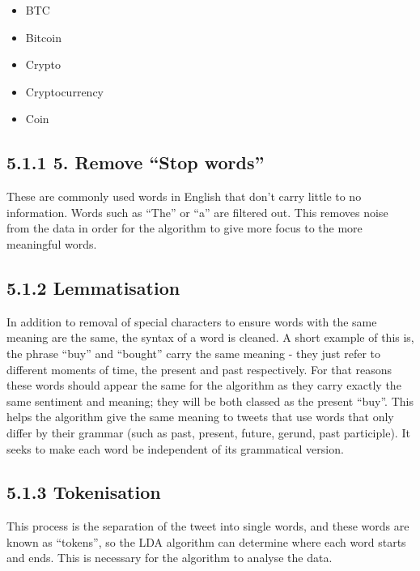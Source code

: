 \documentclass[
]{article}
\providecommand{\tightlist}{%
  \setlength{\itemsep}{0pt}\setlength{\parskip}{0pt}}
\begin{document}
\begin{itemize}
\tightlist
\item
  BTC
\item
  Bitcoin
\item
  Crypto
\item
  Cryptocurrency
\item
  Coin
\end{itemize}

\hypertarget{remove-stop-words}{%
\subsection{5.1.1 5. Remove ``Stop words''}\label{remove-stop-words}}

These are commonly used words in English that don't carry little to no
information. Words such as ``The'' or ``a'' are filtered out. This
removes noise from the data in order for the algorithm to give more
focus to the more meaningful words.

\hypertarget{lemmatisation}{%
\subsection{5.1.2 Lemmatisation}\label{lemmatisation}}

In addition to removal of special characters to ensure words with the
same meaning are the same, the syntax of a word is cleaned. A short
example of this is, the phrase ``buy'' and ``bought'' carry the same
meaning - they just refer to different moments of time, the present and
past respectively. For that reasons these words should appear the same
for the algorithm as they carry exactly the same sentiment and meaning;
they will be both classed as the present ``buy''. This helps the
algorithm give the same meaning to tweets that use words that only
differ by their grammar (such as past, present, future, gerund, past
participle). It seeks to make each word be independent of its
grammatical version.

\hypertarget{tokenisation}{%
\subsection{5.1.3 Tokenisation}\label{tokenisation}}

This process is the separation of the tweet into single words, and these
words are known as ``tokens'', so the LDA algorithm can determine where
each word starts and ends. This is necessary for the algorithm to
analyse the data.
\end{document}
